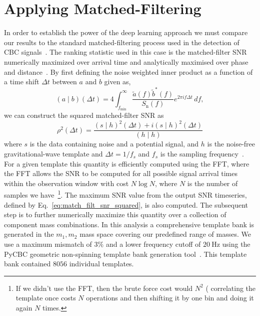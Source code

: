 \section{Applying Matched-Filtering}
%
%
In order to establish the power of the deep learning approach we must compare 
our results to the standard matched-filtering process used in the 
detection of \ac{CBC} signals~\cite{PhysRevD.85.122006,2013PhRvD..87b4033B}. 
The ranking statistic used in this case is the matched-filter 
\ac{SNR} numerically maximized over arrival time and analytically 
maximised over phase and distance~\cite{Anderson2011}. 
By first defining the noise 
weighted inner product as a function of a time shift $\Delta t$ between 
$a$ and $b$ given as,
%
%
\begin{equation}\label{eq:inner}
(a\mid b)(\Delta t) =
4\int_{f_{\mathrm{min}}}^{\infty}\frac{\tilde{a}(f)\tilde{b}^{*}(f)}{S_{\mathrm{n}}(f)}e^{2\pi i
f\Delta t}\,df,
\end{equation}
%
we can construct the squared matched-filter \ac{SNR} as 
%
\begin{equation}\label{eq:match_filt_snr_squared}
\rho^{2}(\Delta t)=\frac{(s\mid h)^{2}(\Delta t) + 
i(s\mid h)^{2}(\Delta t)}{(h\mid h)}
\end{equation}
%
where $s$ is the data containing noise and a potential signal, and $h$ 
is the noise-free gravitational-wave template and 
$\Delta t = 1/f_{s}$ and $f_s$ is the sampling
frequency~\cite{0264-9381-23-18-002}. 
For a given template this quantity is efficiently computed using the 
\ac{FFT}, where the \ac{FFT} allows the \ac{SNR} to be computed 
for all possible signal arrival times within the observation window with 
cost $N\log{N}$, where $N$ is the number of samples we have~\footnote{
If we didn't use the \ac{FFT}, then the brute force cost would $N^2$ (
correlating the template once costs $N$ operations and then shifting it by one 
bin and doing it again $N$ times.}. The maximum 
\ac{SNR} value from the output \ac{SNR} timeseries, defined by 
Eq.~\ref{eq:match_filt_snr_squared}, is also computed. The subsequent 
step is to further numerically maximize this quantity over a 
collection of component mass combinations. In this analysis a 
comprehensive template bank is generated in the $m_{1},m_{2}$ mass 
space covering our predefined range of masses. We use a 
maximum mismatch of $3\%$ and a lower frequency cutoff of 
$20~\mathrm{Hz}$ using the PyCBC geometric non-spinning template 
bank generation tool~\cite{pycbc-software,0264-9381-33-21-215004}. 
This template bank contained $8056$ individual templates. 

